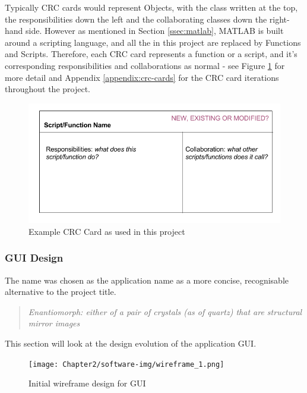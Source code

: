Typically \acrshort{CRC} cards would represent Objects, with the class written at the top, the responsibilities down the left and the collaborating classes down the right-hand side. However as mentioned in Section \ref{ssec:matlab}, MATLAB is built around a scripting language, and all the  in this project are replaced by Functions and Scripts. Therefore, each \acrshort{CRC} card represents a function or a script, and it's corresponding responsibilities and collaborations as normal - see Figure \ref{fig:crc} for more detail and Appendix \ref{appendix:crc-cards} for the \acrshort{CRC} card iterations throughout the project.

\begin{figure}[H]
  \center
  \includegraphics[scale=0.5]{Chapter2/software-img/crc.png}
  \caption{Example CRC Card as used in this project}
  \label{fig:crc}
\end{figure}

\subsubsection{GUI Design}
\label{sssec:gui-design}

The name  was chosen as the application name as a more concise, recognisable alternative to the project title.

\begin{quotation}
  \textit{Enantiomorph: either of a pair of crystals (as of quartz) that are structural mirror images \cite{enantiomorph}}
\end{quotation}

This section will look at the design evolution of the application GUI.

\begin{figure}[H]
  \center
  \texttt{[image: Chapter2/software-img/wireframe\_1.png]}
  \caption{Initial wireframe design for GUI}
  \label{fig:wireframe1}
\end{figure}

